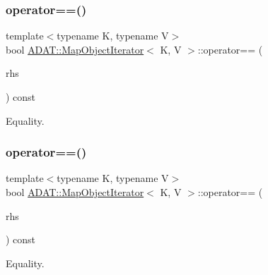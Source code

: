 \subsubsection{\texorpdfstring{operator==()}{operator==()}\hspace{0.1cm}{\footnotesize\ttfamily [1/3]}}
{\footnotesize\ttfamily template$<$typename K, typename V$>$ \\
bool \mbox{\hyperlink{classADAT_1_1MapObjectIterator}{A\+D\+A\+T\+::\+Map\+Object\+Iterator}}$<$ K, V $>$\+::operator== (\begin{DoxyParamCaption}\item[{const \mbox{\hyperlink{classADAT_1_1MapObjectIterator}{Map\+Object\+Iterator}}$<$ K, V $>$ \&}]{rhs }\end{DoxyParamCaption}) const\hspace{0.3cm}{\ttfamily [inline]}}



Equality. 

\mbox{\label{classADAT_1_1MapObjectIterator_a3153929ca4103b625790fb1d09f33e71}} 
\subsubsection{\texorpdfstring{operator==()}{operator==()}\hspace{0.1cm}{\footnotesize\ttfamily [2/3]}}
{\footnotesize\ttfamily template$<$typename K, typename V$>$ \\
bool \mbox{\hyperlink{classADAT_1_1MapObjectIterator}{A\+D\+A\+T\+::\+Map\+Object\+Iterator}}$<$ K, V $>$\+::operator== (\begin{DoxyParamCaption}\item[{const \mbox{\hyperlink{classADAT_1_1MapObjectIterator}{Map\+Object\+Iterator}}$<$ K, V $>$ \&}]{rhs }\end{DoxyParamCaption}) const\hspace{0.3cm}{\ttfamily [inline]}}



Equality. 

\mbox{\label{classADAT_1_1MapObjectIterator_a3153929ca4103b625790fb1d09f33e71}} 
